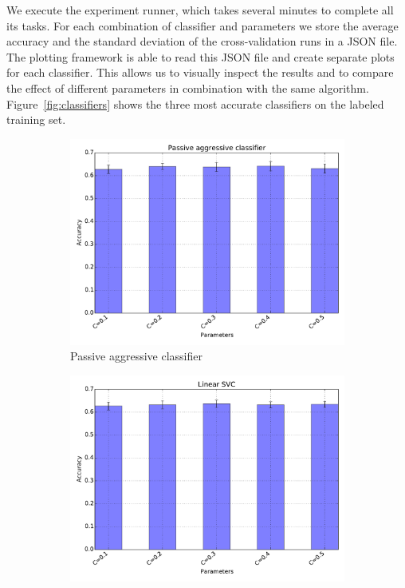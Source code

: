 \documentclass{article}
\begin{document}
We execute the experiment runner, which takes several minutes to complete all
its tasks. For each combination of classifier and parameters we store the
average accuracy and the standard deviation of the cross-validation runs in
a JSON file. The plotting framework is able to read this JSON file and
create separate plots for each classifier. This allows us to visually inspect
the results and to compare the effect of different parameters in combination
with the same algorithm. Figure~\ref{fig:classifiers} shows the three most
accurate classifiers on the labeled training set.

\begin{figure}[h!]
  \centering
  \begin{subfigure}{.48\textwidth}
    \centering
    \includegraphics[width=\textwidth]{Images/Passive_aggressive.pdf}
    \caption{Passive aggressive classifier}\label{fig:classifiers-passive-aggressive}
  \end{subfigure}
  \begin{subfigure}{.48\textwidth}
    \centering
    \includegraphics[width=\textwidth]{Images/Linear_SVC.pdf}

\end{subfigure}
\end{figure}
\end{document}
